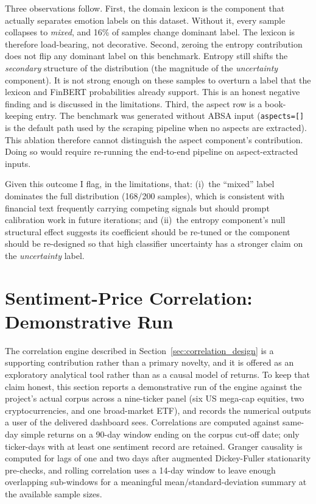 Three observations follow. First, the domain lexicon is the component that actually separates emotion labels on this dataset. Without it, every sample collapses to \textit{mixed}, and 16\% of samples change dominant label. The lexicon is therefore load-bearing, not decorative. Second, zeroing the entropy contribution does not flip any dominant label on this benchmark. Entropy still shifts the \emph{secondary} structure of the distribution (the magnitude of the \textit{uncertainty} component). It is not strong enough on these samples to overturn a label that the lexicon and FinBERT probabilities already support. This is an honest negative finding and is discussed in the limitations. Third, the aspect row is a book-keeping entry. The benchmark was generated without ABSA input (\texttt{aspects=[]} is the default path used by the scraping pipeline when no aspects are extracted). This ablation therefore cannot distinguish the aspect component's contribution. Doing so would require re-running the end-to-end pipeline on aspect-extracted inputs.

Given this outcome I flag, in the limitations, that: (i)~the ``mixed'' label dominates the full distribution (168/200 samples), which is consistent with financial text frequently carrying competing signals but should prompt calibration work in future iterations; and (ii)~the entropy component's null structural effect suggests its coefficient should be re-tuned or the component should be re-designed so that high classifier uncertainty has a stronger claim on the \textit{uncertainty} label.

\section{Sentiment-Price Correlation: Demonstrative Run}
\label{sec:correlation_eval}

The correlation engine described in Section~\ref{sec:correlation_design} is a supporting contribution rather than a primary novelty, and it is offered as an exploratory analytical tool rather than as a causal model of returns. To keep that claim honest, this section reports a demonstrative run of the engine against the project's actual corpus across a nine-ticker panel (six US mega-cap equities, two cryptocurrencies, and one broad-market ETF), and records the numerical outputs a user of the delivered dashboard sees. Correlations are computed against same-day simple returns on a 90-day window ending on the corpus cut-off date; only ticker-days with at least one sentiment record are retained. Granger causality is computed for lags of one and two days after augmented Dickey-Fuller stationarity pre-checks, and rolling correlation uses a 14-day window to leave enough overlapping sub-windows for a meaningful mean/standard-deviation summary at the available sample sizes.

